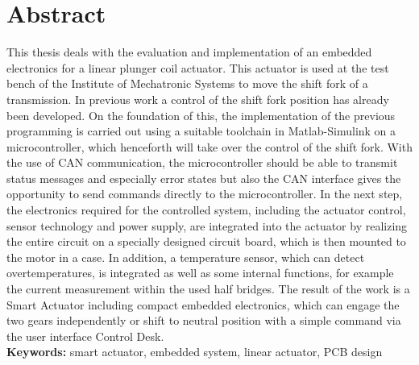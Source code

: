 \documentclass[nochapterpage,bigchapter,linedtoc,longdoc,colorback,accentcolor=tud1c]{tudreport}
\begin{document}
\section*{Abstract}
This thesis deals with the evaluation and implementation of an embedded electronics for a linear plunger coil actuator.  This actuator is used at the test bench of the Institute of Mechatronic Systems to move the shift fork of a transmission.
In previous work a control of the shift fork position has already been developed. On the foundation of this, the implementation of the previous programming is carried out using a suitable toolchain in Matlab-Simulink on a microcontroller, which henceforth will take over the control of the shift fork. With the use of CAN communication, the microcontroller should be able to transmit status messages and especially error states but also the CAN interface gives the opportunity to send commands directly to the microcontroller. In the next step, the electronics required for the controlled system, including the actuator control, sensor technology and power supply, are integrated into the actuator by realizing the entire circuit on a specially designed circuit board, which is then mounted to the motor in a case. In addition, a temperature sensor, which can detect overtemperatures, is integrated as well as some internal functions, for example the current measurement within the used half bridges.  The result of the work is a Smart Actuator including compact embedded electronics, which can engage the two gears independently or shift to neutral position with a simple command via the user interface Control Desk.\\

\textbf{Keywords:} smart actuator, embedded system, linear actuator, PCB design
\cleardoublepage
{}
{}
\tableofcontents
\cleardoublepage
{}
{}
\listoffigures
\cleardoublepage
{}
{}
\listoftables

\cleardoublepage
{}








\newpage
{}
{}
\printbibliography[title=Literaturverzeichnis]


\end{document}
